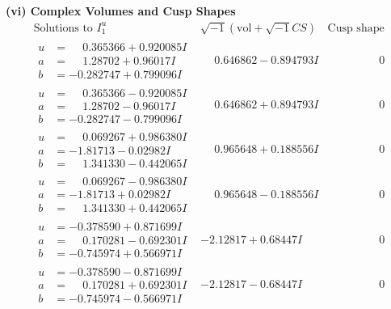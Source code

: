 \documentclass[1p]{elsarticle_modified}
\theoremstyle{definition}
\newcommand{\I}{\sqrt{-1}}
\begin{document}
\newpage\flushleft \textbf{(vi) Complex Volumes and Cusp Shapes}
$$\begin{array}{c|c|c}  
\text{Solutions to }I^u_{1}& \I (\text{vol} + \sqrt{-1}CS) & \text{Cusp shape}\\
 \hline 
\begin{aligned}
u &= \phantom{-}0.365366 + 0.920085 I \\
a &= \phantom{-}1.28702 + 0.96017 I \\
b &= -0.282747 + 0.799096 I\end{aligned}
 & \phantom{-}0.646862 - 0.894793 I & \phantom{-0.000000 } 0 \\ \hline\begin{aligned}
u &= \phantom{-}0.365366 - 0.920085 I \\
a &= \phantom{-}1.28702 - 0.96017 I \\
b &= -0.282747 - 0.799096 I\end{aligned}
 & \phantom{-}0.646862 + 0.894793 I & \phantom{-0.000000 } 0 \\ \hline\begin{aligned}
u &= \phantom{-}0.069267 + 0.986380 I \\
a &= -1.81713 - 0.02982 I \\
b &= \phantom{-}1.341330 - 0.442065 I\end{aligned}
 & \phantom{-}0.965648 + 0.188556 I & \phantom{-0.000000 } 0 \\ \hline\begin{aligned}
u &= \phantom{-}0.069267 - 0.986380 I \\
a &= -1.81713 + 0.02982 I \\
b &= \phantom{-}1.341330 + 0.442065 I\end{aligned}
 & \phantom{-}0.965648 - 0.188556 I & \phantom{-0.000000 } 0 \\ \hline\begin{aligned}
u &= -0.378590 + 0.871699 I \\
a &= \phantom{-}0.170281 - 0.692301 I \\
b &= -0.745974 + 0.566971 I\end{aligned}
 & -2.12817 + 0.68447 I & \phantom{-0.000000 } 0 \\ \hline\begin{aligned}
u &= -0.378590 - 0.871699 I \\
a &= \phantom{-}0.170281 + 0.692301 I \\
b &= -0.745974 - 0.566971 I\end{aligned}
 & -2.12817 - 0.68447 I & \phantom{-0.000000 } 0 \\ \hline\begin{aligned}

\end{aligned}
\end{array}$$
\end{document}
